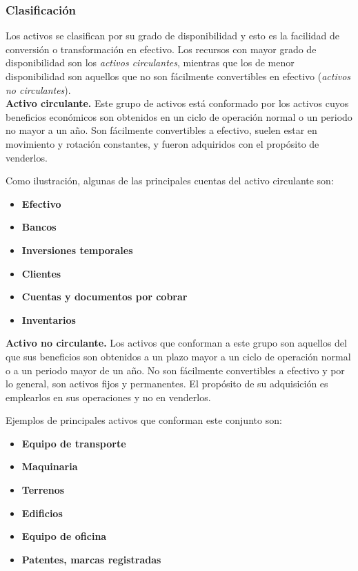 \documentclass[12pt]{article}
\begin{document}
		\subsubsection{Clasificación}

			Los activos se clasifican por su grado de disponibilidad y esto es la facilidad de conversión o transformación en efectivo. Los recursos con mayor grado de disponibilidad son los \emph{activos circulantes}, mientras que los de menor disponibilidad son aquellos que no son fácilmente convertibles en efectivo (\emph{activos no circulantes}). \\

			\textbf{Activo circulante.} Este grupo de activos está conformado por los activos cuyos beneficios económicos son obtenidos en un ciclo de operación normal o un periodo no mayor a un año. Son fácilmente convertibles a efectivo, suelen estar en movimiento y rotación constantes, y fueron adquiridos con el propósito de venderlos.

			Como ilustración, algunas de las principales cuentas del activo circulante son:

			\begin{itemize}
				\item \textbf{Efectivo}
				\item \textbf{Bancos}
				\item \textbf{Inversiones temporales}
				\item \textbf{Clientes}
				\item \textbf{Cuentas y documentos por cobrar}
				\item \textbf{Inventarios}
			\end{itemize}

			\textbf{Activo no circulante.} Los activos que conforman a este grupo son aquellos del que sus beneficios son obtenidos a un plazo mayor a un ciclo de operación normal o a un periodo mayor de un año. No son fácilmente convertibles a efectivo y por lo general, son activos fijos y permanentes. El propósito de su adquisición es emplearlos en sus operaciones y no en venderlos.

			Ejemplos de principales activos que conforman este conjunto son:

			\begin{itemize}
				\item \textbf{Equipo de transporte}
				\item \textbf{Maquinaria}
				\item \textbf{Terrenos}
				\item \textbf{Edificios}
				\item \textbf{Equipo de oficina}
				\item \textbf{Patentes, marcas registradas}
			\end{itemize}
\end{document}
